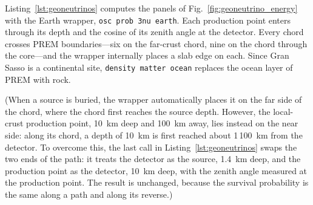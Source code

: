 \documentclass[final,5p,times,twocolumn,sort,compress]{elsarticle}
\makeatletter
\newcommand{\fig}{Fig.}
\DeclareRobustCommand{\_}{%
  \ifmmode\nfss@text{\textunderscore}\else\textunderscore\allowbreak\fi}
\newcommand{\figu}[1]{\fig~\ref{fig:#1}}
\makeatother
\begin{document}
Listing~\ref{lst:geoneutrinos} computes the panels of \figu{geoneutrino_energy} with the Earth wrapper, {\tt osc\_prob\_3nu\_earth}. Each production point enters through its depth and the cosine of its zenith angle at the detector. Every chord crosses PREM boundaries---six on the far-crust chord, nine on the chord through the core---and the wrapper internally places a slab edge on each. Since Gran Sasso is a continental site, {\tt density\_matter\_ocean} replaces the ocean layer of PREM with rock.

(When a source is buried, the wrapper automatically places it on the far side of the chord, where the chord first reaches the source depth. However, the local-crust production point, 10~km deep and 100~km away, lies instead on the near side: along its chord, a depth of 10~km is first reached about 1\,100~km from the detector. To overcome this, the last call in Listing~\ref{lst:geoneutrinos} swaps the two ends of the path: it treats the detector as the source, 1.4~km deep, and the production point as the detector, 10~km deep, with the zenith angle measured at the production point. The result is unchanged, because the survival probability is the same along a path and along its reverse.)
\end{document}
